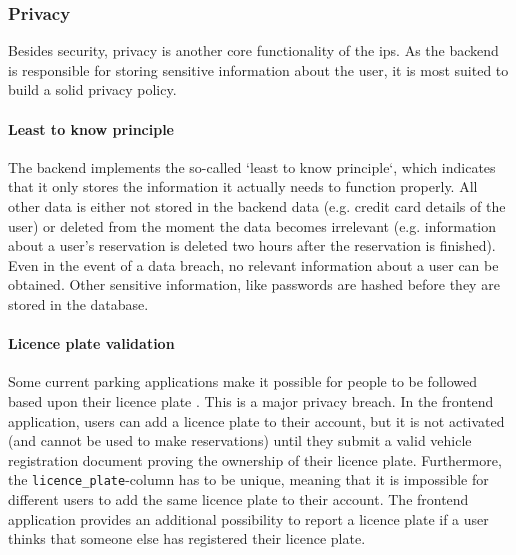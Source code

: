 \subsubsection{Privacy}
Besides security, privacy is another core functionality of the \ac{ips}. As the backend is responsible for storing sensitive information about the user, it is most suited to build a solid privacy policy.

\paragraph{Least to know principle}
The backend implements the so-called `least to know principle`, which indicates that it only stores the information it actually needs to function properly. All other data is either not stored in the backend data (e.g. credit card details of the user) or deleted from the moment the data becomes irrelevant (e.g. information about a user's reservation is deleted two hours after the reservation is finished). Even in the event of a data breach, no relevant information about a user can be obtained. Other sensitive information, like passwords are hashed before they are stored in the database.

\paragraph{Licence plate validation}\label{sec:licence-plate-validation}
Some current parking applications make it possible for people to be followed based upon their licence plate \cite{privacy_breach}. This is a major privacy breach. In the frontend application, users can add a licence plate to their account, but it is not activated (and cannot be used to make reservations) until they submit a valid vehicle registration document proving the ownership of their licence plate. Furthermore, the \verb|licence_plate|-column has to be unique, meaning that it is impossible for different users to add the same licence plate to their account. The frontend application provides an additional possibility to report a licence plate if a user thinks that someone else has registered their licence plate.

